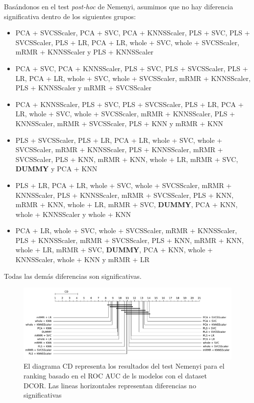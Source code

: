 \documentclass[a4paper,oneside,11pt,leqno]{article}
\begin{document}
	Basándonos en el test \textit{post-hoc} de Nemenyi, asumimos que no hay diferencia significativa dentro de los siguientes grupos:

	\begin{itemize}
		\item PCA + SVCSScaler, PCA + SVC, PCA + KNNSScaler, PLS + SVC, PLS + SVCSScaler, PLS + LR, PCA + LR, whole + SVC, whole + SVCSScaler, mRMR + KNNSScaler y PLS + KNNSScaler

		\item  PCA + SVC, PCA + KNNSScaler, PLS + SVC, PLS + SVCSScaler, PLS + LR, PCA + LR, whole + SVC, whole + SVCSScaler, mRMR + KNNSScaler, PLS + KNNSScaler y mRMR + SVCSScaler

		\item PCA + KNNSScaler, PLS + SVC, PLS + SVCSScaler, PLS + LR, PCA + LR, whole + SVC, whole + SVCSScaler, mRMR + KNNSScaler, PLS + KNNSScaler, mRMR + SVCSScaler, PLS + KNN y mRMR + KNN

		\item PLS + SVCSScaler, PLS + LR, PCA + LR, whole + SVC, whole + SVCSScaler, mRMR + KNNSScaler, PLS + KNNSScaler, mRMR + SVCSScaler, PLS + KNN, mRMR + KNN, whole + LR, mRMR + SVC,  \textbf{DUMMY} y PCA + KNN

		\item PLS + LR, PCA + LR, whole + SVC, whole + SVCSScaler, mRMR + KNNSScaler, PLS + KNNSScaler, mRMR + SVCSScaler, PLS + KNN, mRMR + KNN, whole + LR, mRMR + SVC,  \textbf{DUMMY}, PCA + KNN, whole + KNNSScaler y whole + KNN


		\item   PCA + LR, whole + SVC, whole + SVCSScaler, mRMR + KNNSScaler, PLS + KNNSScaler, mRMR + SVCSScaler, PLS + KNN, mRMR + KNN, whole + LR, mRMR + SVC,  \textbf{DUMMY}, PCA + KNN, whole + KNNSScaler, whole + KNN y mRMR + LR
	\end{itemize}

	Todas las demás diferencias son significativas.

	\begin{figure}[h]
		\includegraphics[width=\linewidth]{stat_results_dcor.pdf}
		\caption{El diagrama CD representa los resultados del test Nemenyi para el ranking basado en el ROC AUC de ls modelos con el dataset DCOR. Las lineas horizontales representan diferencias no significativas}
		\label{fig:stats_fig_dcor}
	\end{figure}
\end{document}
